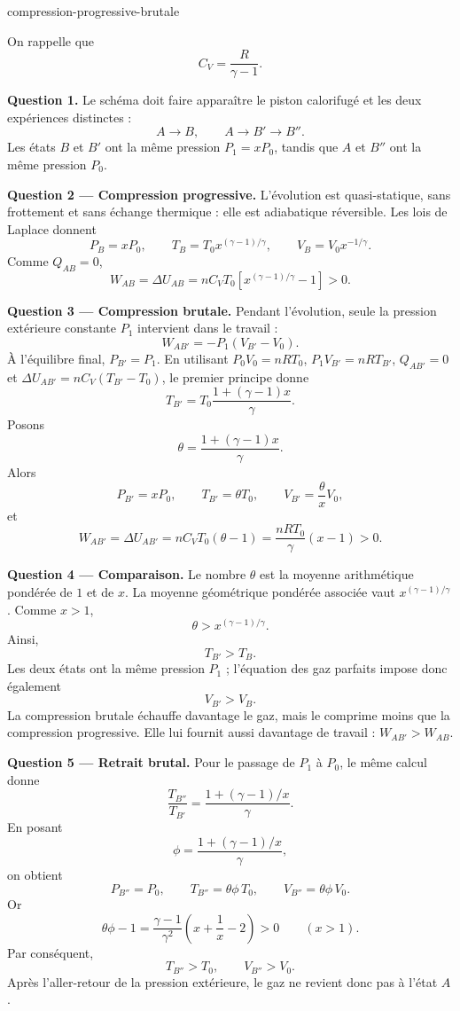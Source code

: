 \begin{exo}{compression-progressive-brutale}
\begin{solution}
On rappelle que
\[
C_V=\frac{R}{\gamma-1}.
\]

\textbf{Question 1.} Le schéma doit faire apparaître le piston calorifugé et
les deux expériences distinctes :
\[
A\longrightarrow B,
\qquad
A\longrightarrow B'\longrightarrow B''.
\]
Les états $B$ et $B'$ ont la même pression $P_1=xP_0$, tandis que $A$ et
$B''$ ont la même pression $P_0$.

\textbf{Question 2 --- Compression progressive.} L'évolution est
quasi-statique, sans frottement et sans échange thermique : elle est
adiabatique réversible. Les lois de Laplace donnent
\[
P_B=xP_0,
\qquad
T_B=T_0x^{(\gamma-1)/\gamma},
\qquad
V_B=V_0x^{-1/\gamma}.
\]
Comme $Q_{AB}=0$,
\[
W_{AB}=\Delta U_{AB}
=nC_VT_0\left[x^{(\gamma-1)/\gamma}-1\right]>0.
\]

\textbf{Question 3 --- Compression brutale.} Pendant l'évolution, seule la
pression extérieure constante $P_1$ intervient dans le travail :
\[
W_{AB'}=-P_1(V_{B'}-V_0).
\]
À l'équilibre final, $P_{B'}=P_1$. En utilisant
$P_0V_0=nRT_0$, $P_1V_{B'}=nRT_{B'}$, $Q_{AB'}=0$ et
$\Delta U_{AB'}=nC_V(T_{B'}-T_0)$, le premier principe donne
\[
T_{B'}=T_0\frac{1+(\gamma-1)x}{\gamma}.
\]
Posons
\[
\theta=\frac{1+(\gamma-1)x}{\gamma}.
\]
Alors
\[
P_{B'}=xP_0,
\qquad
T_{B'}=\theta T_0,
\qquad
V_{B'}=\frac{\theta}{x}V_0,
\]
et
\[
W_{AB'}=\Delta U_{AB'}
=nC_VT_0(\theta-1)
=\frac{nRT_0}{\gamma}(x-1)>0.
\]

\textbf{Question 4 --- Comparaison.} Le nombre $\theta$ est la moyenne
arithmétique pondérée de $1$ et de $x$. La moyenne géométrique pondérée
associée vaut $x^{(\gamma-1)/\gamma}$. Comme $x>1$,
\[
\theta>x^{(\gamma-1)/\gamma}.
\]
Ainsi,
\[
T_{B'}>T_B.
\]
Les deux états ont la même pression $P_1$ ; l'équation des gaz parfaits impose
donc également
\[
V_{B'}>V_B.
\]
La compression brutale échauffe davantage le gaz, mais le comprime moins que
la compression progressive. Elle lui fournit aussi davantage de travail :
$W_{AB'}>W_{AB}$.

\textbf{Question 5 --- Retrait brutal.} Pour le passage de $P_1$ à $P_0$,
le même calcul donne
\[
\frac{T_{B''}}{T_{B'}}
=\frac{1+(\gamma-1)/x}{\gamma}.
\]
En posant
\[
\phi=\frac{1+(\gamma-1)/x}{\gamma},
\]
on obtient
\[
P_{B''}=P_0,
\qquad
T_{B''}=\theta\phi\,T_0,
\qquad
V_{B''}=\theta\phi\,V_0.
\]
Or
\[
\theta\phi-1
=\frac{\gamma-1}{\gamma^2}
\left(x+\frac1x-2\right)>0
\qquad (x>1).
\]
Par conséquent,
\[
\boxed{T_{B''}>T_0},
\qquad
\boxed{V_{B''}>V_0}.
\]
Après l'aller-retour de la pression extérieure, le gaz ne revient donc pas à
l'état $A$.


\end{solution}
\end{exo}
